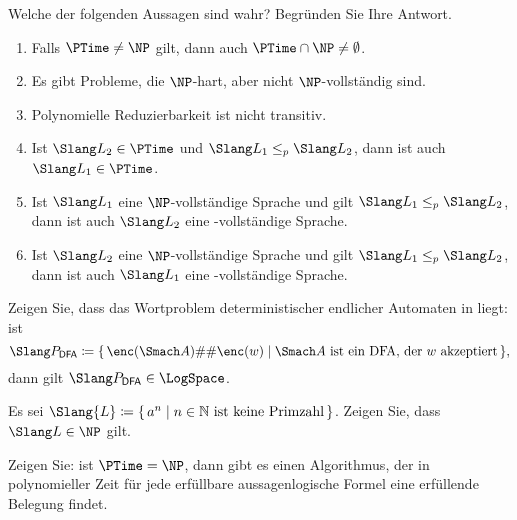 \documentclass[german]{latteachCD}[2017/03/28]
\begin{document}
\vspace*{0.5\baselineskip}

\setcounter{exercise}{0}

\begin{exercise}
  Welche der folgenden Aussagen sind wahr?  Begründen Sie Ihre Antwort.
  \begin{enumerate}
  \item Falls $\PTime \neq \NP$ gilt, dann auch $\PTime \cap \NP \neq \emptyset$.
  \item Es gibt Probleme, die $\NP$-hart, aber nicht $\NP$-vollständig sind.
  \item Polynomielle Reduzierbarkeit ist nicht transitiv.
  \item Ist $\Slang L_{2} \in \PTime$ und $\Slang L_{1} \leq_{p} \Slang L_{2}$,
    dann ist auch $\Slang L_{1} \in \PTime$.
  \item Ist $\Slang L_{1}$ eine $\NP$-vollständige Sprache und gilt $\Slang
    L_{1} \leq_{p} \Slang L_{2}$, dann ist auch $\Slang L_{2}$ eine
    \NP-vollständige Sprache.
  \item Ist $\Slang L_{2}$ eine $\NP$-vollständige Sprache und gilt $\Slang
    L_{1} \leq_{p} \Slang L_{2}$, dann ist auch $\Slang L_{1}$ eine
    \NP-vollständige Sprache.
  \end{enumerate}
\end{exercise}

\begin{exercise}
  Zeigen Sie, dass das Wortproblem deterministischer endlicher Automaten in
  \LogSpace liegt: ist
  \begin{equation*}
    \Slang P_{\mathsf{DFA}} \coloneqq \{\,\enc(\Smach A)\#\#\enc(w) \mid
    \Smach A \text{ ist ein DFA, der $w$ akzeptiert}\,\},
  \end{equation*}
  dann gilt $\Slang P_{\mathsf{DFA}} \in \LogSpace$.
\end{exercise}

\begin{exercise}
  Es sei $\Slang{L} \coloneqq \{\,a^{n} \mid n \in \mathbb N \text{ ist keine
    Primzahl}\,\}$.  Zeigen Sie, dass $\Slang L \in \NP$ gilt.
\end{exercise}

\begin{exercise}
  Zeigen Sie: ist $\PTime = \NP$, dann gibt es einen Algorithmus, der in
  polynomieller Zeit für jede erfüllbare aussagenlogische Formel eine erfüllende
  Belegung findet.
\end{exercise}
\end{document}

